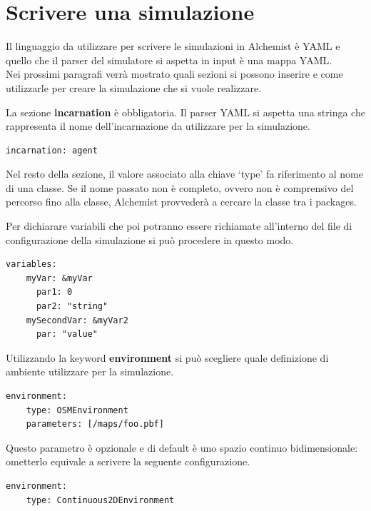 \section{Scrivere una simulazione}\label{sctn:ScrivereUnaSimulazione}
\lstset{
  basicstyle=\ttfamily,
  captionpos=b,
  numbers=none,
  frame=tb,
}
Il linguaggio da utilizzare per scrivere le simulazioni in Alchemist è YAML e quello che il parser del simulatore si aspetta in input è una mappa YAML.
\\
Nei prossimi paragrafi verrà mostrato quali sezioni si possono inserire e come utilizzarle per creare la simulazione che si vuole realizzare.

La sezione \textbf{incarnation} è obbligatoria. Il parser YAML si aspetta una stringa che rappresenta il nome dell'incarnazione da utilizzare per la simulazione.
\medskip
\begin{lstlisting}[firstnumber=last, caption={Incarnazione}]
  incarnation: agent
\end{lstlisting}

Nel resto della sezione, il valore associato alla chiave `type' fa riferimento al nome di una classe. Se il nome passato non è completo, ovvero non è comprensivo del percorso fino alla classe, Alchemist provvederà a cercare la classe tra i packages.

Per dichiarare variabili che poi potranno essere richiamate all'interno del file di configurazione della simulazione si può procedere in questo modo.
\medskip
\begin{lstlisting}[firstnumber=last,caption={Variabili simulazione}]
  variables:
    myVar: &myVar
      par1: 0
      par2: "string"
    mySecondVar: &myVar2
      par: "value"
\end{lstlisting}

Utilizzando la keyword \textbf{environment} si può scegliere quale definizione di ambiente utilizzare per la simulazione.
\medskip
\begin{lstlisting}[firstnumber=last,caption={Environment}]
  environment:
    type: OSMEnvironment
    parameters: [/maps/foo.pbf]
\end{lstlisting}
Questo parametro è opzionale e di default è uno spazio continuo bidimensionale: ometterlo equivale a scrivere la seguente configurazione.
\medskip
\begin{lstlisting}[firstnumber=last,caption={Default environment}]
  environment:
    type: Continuous2DEnvironment
\end{lstlisting}

